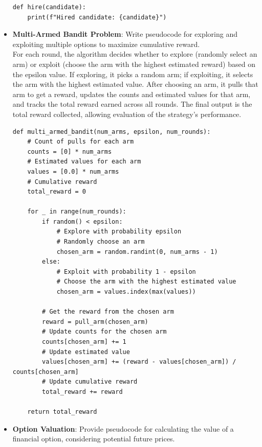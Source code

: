 \documentclass[12pt]{exam}
\begin{document}
\begin{questions}
\begin{itemize}
\begin{lstlisting}
def hire(candidate):
    print(f"Hired candidate: {candidate}")
    \end{lstlisting}
    
    \item \textbf{Multi-Armed Bandit Problem}: Write pseudocode for exploring and exploiting multiple options to maximize cumulative reward.\\

    For each round, the algorithm decides whether to explore (randomly select an arm) or exploit (choose the arm with the highest estimated reward) based on the epsilon value. If exploring, it picks a random arm; if exploiting, it selects the arm with the highest estimated value. After choosing an arm, it pulls that arm to get a reward, updates the counts and estimated values for that arm, and tracks the total reward earned across all rounds. The final output is the total reward collected, allowing evaluation of the strategy's performance. \\

    \begin{lstlisting}
def multi_armed_bandit(num_arms, epsilon, num_rounds):
    # Count of pulls for each arm
    counts = [0] * num_arms 
    # Estimated values for each arm
    values = [0.0] * num_arms 
    # Cumulative reward
    total_reward = 0 

    for _ in range(num_rounds):
        if random() < epsilon:
            # Explore with probability epsilon
            # Randomly choose an arm
            chosen_arm = random.randint(0, num_arms - 1) 
        else:
            # Exploit with probability 1 - epsilon
            # Choose the arm with the highest estimated value
            chosen_arm = values.index(max(values))  

        # Get the reward from the chosen arm
        reward = pull_arm(chosen_arm)   
        # Update counts for the chosen arm
        counts[chosen_arm] += 1
        # Update estimated value
        values[chosen_arm] += (reward - values[chosen_arm]) / counts[chosen_arm]  
        # Update cumulative reward
        total_reward += reward

    return total_reward
    \end{lstlisting}
    
    \item \textbf{Option Valuation}: Provide pseudocode for calculating the value of a financial option, considering potential future prices.\\


\end{itemize}
\end{questions}
\end{document}
